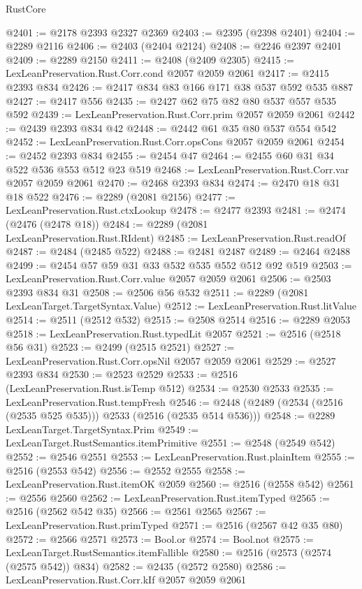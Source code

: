 \begin{lexlean}{RustCore}
\begin{coremodule}
@2401 := @2178 @2393 @2327 @2369
@2403 := @2395 (@2398 @2401)
@2404 := @2289 @2116
@2406 := @2403 (@2404 @2124)
@2408 := @2246 @2397 @2401
@2409 := @2289 @2150
@2411 := @2408 (@2409 @2305)
@2415 := LexLeanPreservation.Rust.Corr.cond @2057 @2059 @2061
@2417 := @2415 @2393 @834
@2426 := @2417 @834 @83 @166 @171 @38 @537 @592 @535 @887
@2427 := @2417 @556
@2435 := @2427 @62 @75 @82 @80 @537 @557 @535 @592
@2439 := LexLeanPreservation.Rust.Corr.prim @2057 @2059 @2061
@2442 := @2439 @2393 @834 @42
@2448 := @2442 @61 @35 @80 @537 @554 @542
@2452 := LexLeanPreservation.Rust.Corr.opsCons @2057 @2059 @2061
@2454 := @2452 @2393 @834
@2455 := @2454 @47
@2464 := @2455 @60 @31 @34 @522 @536 @553 @512 @23 @519
@2468 := LexLeanPreservation.Rust.Corr.var @2057 @2059 @2061
@2470 := @2468 @2393 @834
@2474 := @2470 @18 @31 @18 @522
@2476 := @2289 (@2081 @2156)
@2477 := LexLeanPreservation.Rust.ctxLookup
@2478 := @2477 @2393
@2481 := @2474 (@2476 (@2478 @18))
@2484 := @2289 (@2081 LexLeanPreservation.Rust.RIdent)
@2485 := LexLeanPreservation.Rust.readOf
@2487 := @2484 (@2485 @522)
@2488 := @2481 @2487
@2489 := @2464 @2488
@2499 := @2454 @57 @59 @31 @33 @532 @535 @552 @512 @92 @519
@2503 := LexLeanPreservation.Rust.Corr.value @2057 @2059 @2061
@2506 := @2503 @2393 @834 @31
@2508 := @2506 @56 @532
@2511 := @2289 (@2081 LexLeanTarget.TargetSyntax.Value)
@2512 := LexLeanPreservation.Rust.litValue
@2514 := @2511 (@2512 @532)
@2515 := @2508 @2514
@2516 := @2289 @2053
@2518 := LexLeanPreservation.Rust.typedLit @2057
@2521 := @2516 (@2518 @56 @31)
@2523 := @2499 (@2515 @2521)
@2527 := LexLeanPreservation.Rust.Corr.opsNil @2057 @2059 @2061
@2529 := @2527 @2393 @834
@2530 := @2523 @2529
@2533 := @2516 (LexLeanPreservation.Rust.isTemp @512)
@2534 := @2530 @2533
@2535 := LexLeanPreservation.Rust.tempFresh
@2546 := @2448 (@2489 (@2534 (@2516 (@2535 @525 @535))) @2533 (@2516 (@2535 @514 @536)))
@2548 := @2289 LexLeanTarget.TargetSyntax.Prim
@2549 := LexLeanTarget.RustSemantics.itemPrimitive
@2551 := @2548 (@2549 @542)
@2552 := @2546 @2551
@2553 := LexLeanPreservation.Rust.plainItem
@2555 := @2516 (@2553 @542)
@2556 := @2552 @2555
@2558 := LexLeanPreservation.Rust.itemOK @2059
@2560 := @2516 (@2558 @542)
@2561 := @2556 @2560
@2562 := LexLeanPreservation.Rust.itemTyped
@2565 := @2516 (@2562 @542 @35)
@2566 := @2561 @2565
@2567 := LexLeanPreservation.Rust.primTyped
@2571 := @2516 (@2567 @42 @35 @80)
@2572 := @2566 @2571
@2573 := Bool.or
@2574 := Bool.not
@2575 := LexLeanTarget.RustSemantics.itemFallible
@2580 := @2516 (@2573 (@2574 (@2575 @542)) @834)
@2582 := @2435 (@2572 @2580)
@2586 := LexLeanPreservation.Rust.Corr.kIf @2057 @2059 @2061

\end{coremodule}
\end{lexlean}
